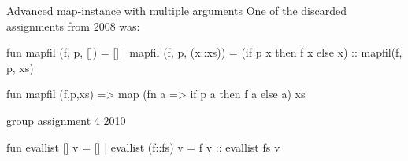 \begin{example}{Advanced \textsf{map}-instance with multiple arguments}
  One of the discarded assignments from 2008 was:

fun mapfil (f, p, []) = []
  | mapfil (f, p, (x::xs)) = (if p x then f x else x) :: mapfil(f, p, xs)



fun mapfil (f,p,xs) => map (fn a => if p a then f a else a) xs

\end{example}


\begin{example}
group assignment 4 2010
  \begin{sml}
fun evallist [] v      = []
  | evallist (f::fs) v = f v :: evallist fs v    
  \end{sml}
\end{example}


